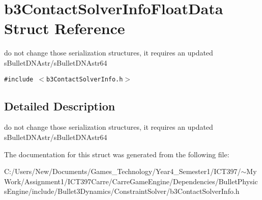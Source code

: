 \hypertarget{structb3_contact_solver_info_float_data}{
\section{b3ContactSolverInfoFloatData Struct Reference}
\label{structb3_contact_solver_info_float_data}
}
do not change those serialization structures, it requires an updated sBulletDNAstr/sBulletDNAstr64  


{\tt \#include $<$b3ContactSolverInfo.h$>$}



\subsection{Detailed Description}
do not change those serialization structures, it requires an updated sBulletDNAstr/sBulletDNAstr64 

The documentation for this struct was generated from the following file:\begin{CompactItemize}
\item 
C:/Users/New/Documents/Games\_\-Technology/Year4\_\-Semester1/ICT397/$\sim$My Work/Assignment1/ICT397Carre/CarreGameEngine/Dependencies/BulletPhysicsEngine/include/Bullet3Dynamics/ConstraintSolver/b3ContactSolverInfo.h\end{CompactItemize}
